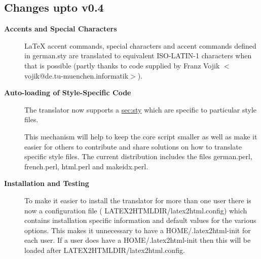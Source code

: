 \subsection{Changes upto v0.4}
\begin{description}
\item[{\bf Accents and Special Characters}]
LaTeX accent commands, special characters and accent commands defined
in {\fn german.sty} are translated to equivalent ISO-LATIN-1
characters when that is possible (partly thanks to code supplied
by Franz Vojik $<$vojik@de.tu-muenchen.informatik$>$).
\item[{\bf Auto-loading of Style-Specific Code}]
The translator now supports a 
\hyperref{mechanism for including Perl code extensions}{mechanism for
including Perl code extensions (see Section }{)}{sec:sty}
which are specific to particular style files. 


This mechanism will help to keep the core script smaller as well as make
it easier for others to contribute and share solutions on  
how to translate specific style files. The current distribution includes the files
{\fn german.perl}, {\fn french.perl}, {\fn html.perl} and {\fn makeidx.perl}.
\item[{\bf Installation and Testing}]
To make it easier to install the translator for more than one user
there is now a configuration file ({\fn
LATEX2HTMLDIR/latex2html.config}) which contains installation specific 
information and default values for the various options. 
This makes it unnecessary to have a {\fn HOME/.latex2html-init} for
each user.
If a user does have a  {\fn HOME/.latex2html-init} then this will be
loaded after {\fn
LATEX2HTMLDIR/latex2html.config}.


\end{description}
